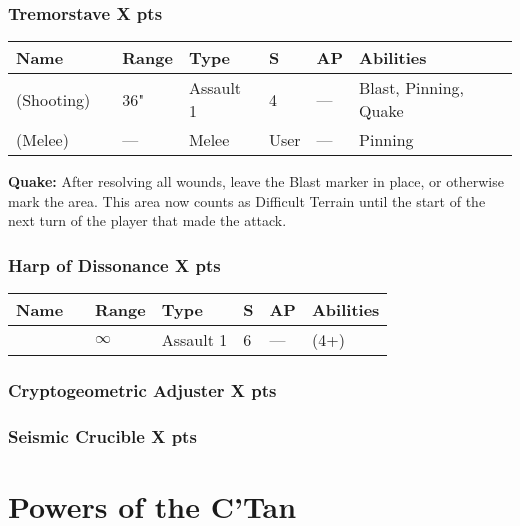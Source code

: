 \subsubsection[Tremorstave]{Tremorstave \hrulefill X pts}
\label{Tremorstave}
\noindent
\begin{tabular}{||m{130pt} m{10pt} m{31pt} m{55pt} m{12pt} m{12pt} m{210pt}||}
	\hline
	Name & & Range & Type & S & AP & Abilities \\
	\hline
	\quickref{Tremorstave} (Shooting) & & 36" & Assault 1 & 4 & — & Blast, Pinning, Quake \\
	\quickref{Tremorstave} (Melee) & & — & Melee & User & — & Pinning \\
	\hline
\end{tabular}
\textbf{Quake:} After resolving all wounds, leave the Blast marker in place, or otherwise mark the area. This area now counts as Difficult Terrain until the start of the next turn of the player that made the attack.

\subsubsection[Harp of Dissonance ]{Harp of Dissonance  \hrulefill X pts}

\label{Harp of Dissonance}
\noindent
\begin{tabular}{||m{130pt} m{10pt} m{31pt} m{55pt} m{12pt} m{12pt} m{210pt}||}
	\hline
	Name & & Range & Type & S & AP & Abilities \\
	\hline
	\quickref{Harp of Dissonance} & & $\infty$ & Assault 1 & 6 & — & \quickref{Entropic Strike} (4+) \\
	\hline
\end{tabular}

\subsubsection[Cryptogeometric Adjuster ]{Cryptogeometric Adjuster  \hrulefill X pts}


\subsubsection[Seismic Crucible]{Seismic Crucible \hrulefill X pts}


\section{Powers of the C'Tan} \label{Powers of the C'Tan}

